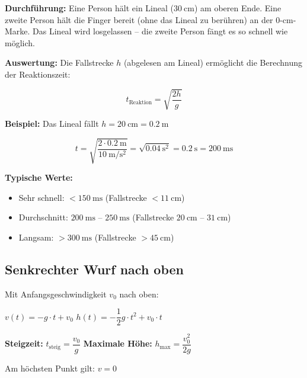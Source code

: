 \documentclass[11pt, a4paper]{article}
\begin{document}
\begin{beispielbox}[title=Lineal-Experiment zur Reaktionszeit]
\textbf{Durchführung:} Eine Person hält ein Lineal ($\SI{30}{\centi\metre}$) am oberen Ende. Eine zweite Person hält die Finger bereit (ohne das Lineal zu berühren) an der 0-cm-Marke. Das Lineal wird losgelassen -- die zweite Person fängt es so schnell wie möglich.

\textbf{Auswertung:} Die Fallstrecke $h$ (abgelesen am Lineal) ermöglicht die Berechnung der Reaktionszeit:

$$t_{\text{Reaktion}} = \sqrt{\dfrac{2h}{g}}$$

\textbf{Beispiel:} Das Lineal fällt $h = \SI{20}{\centi\metre} = \SI{0,2}{\metre}$

$$t = \sqrt{\dfrac{2 \cdot \SI{0,2}{\metre}}{\SI{10}{\metre\per\second\squared}}} = \sqrt{\SI{0,04}{\second\squared}} = \SI{0,2}{\second} = \SI{200}{\milli\second}$$

\textbf{Typische Werte:}
\begin{itemize}[leftmargin=1em]
    \item Sehr schnell: $< \SI{150}{\milli\second}$ (Fallstrecke $< \SI{11}{\centi\metre}$)
    \item Durchschnitt: $\SI{200}{\milli\second}$ -- $\SI{250}{\milli\second}$ (Fallstrecke $\SI{20}{\centi\metre}$ -- $\SI{31}{\centi\metre}$)
    \item Langsam: $> \SI{300}{\milli\second}$ (Fallstrecke $> \SI{45}{\centi\metre}$)
\end{itemize}
\end{beispielbox}

\subsection{Senkrechter Wurf nach oben}

\begin{formelbox}[title=Senkrechter Wurf nach oben]
Mit Anfangsgeschwindigkeit $v_0$ nach oben:

\begin{center}
$v(t) = -g \cdot t + v_0$ \hspace{2cm} $h(t) = -\dfrac{1}{2} g \cdot t^2 + v_0 \cdot t$
\end{center}

\textbf{Steigzeit:} $t_{\text{steig}} = \dfrac{v_0}{g}$ \hspace{2cm} \textbf{Maximale Höhe:} $h_{\text{max}} = \dfrac{v_0^2}{2g}$

Am höchsten Punkt gilt: $v = 0$
\end{formelbox}
\end{document}
